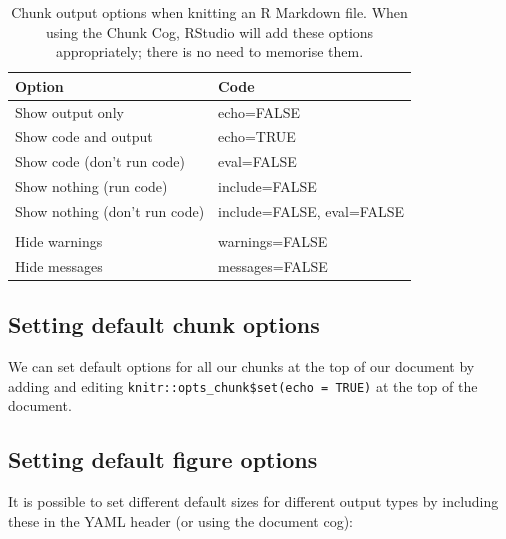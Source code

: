 \documentclass[
  12pt,
  krantz2]{krantz}
\makeatletter
\newenvironment{Shaded}{\begin{snugshade}}{\end{snugshade}}
\newcommand{\BaseNTok}[1]{\textcolor[rgb]{0.00,0.00,0.81}{#1}}
\newenvironment{kframe}{%
\medskip{}
\setlength{\fboxsep}{.8em}
 \def\at@end@of@kframe{}%
 \ifinner\ifhmode%
  \def\at@end@of@kframe{\end{minipage}}%
  \begin{minipage}{\columnwidth}%
 \fi\fi%
 \def\FrameCommand##1{\hskip\@totalleftmargin \hskip-\fboxsep
 \colorbox{shadecolor}{##1}\hskip-\fboxsep
     \hskip-\linewidth \hskip-\@totalleftmargin \hskip\columnwidth}%
 \MakeFramed {\advance\hsize-\width
   \@totalleftmargin\z@ \linewidth\hsize
   \@setminipage}}%
 {\par\unskip\endMakeFramed%
 \at@end@of@kframe}
\renewenvironment{Shaded}{\begin{kframe}}{\end{kframe}}
\makeatother
\begin{document}
\begin{table}

\caption{\label{tab:chap12-tab-chunk-output}Chunk output options when knitting an R Markdown file. When using the Chunk Cog, RStudio will add these options appropriately; there is no need to memorise them.}
\centering
\begin{tabular}[t]{ll}
\toprule
Option & Code\\
\midrule
Show output only & echo=FALSE\\
Show code and output & echo=TRUE\\
Show code (don't run code) & eval=FALSE\\
Show nothing (run code) & include=FALSE\\
Show nothing (don't run code) & include=FALSE, eval=FALSE\\
\addlinespace
 & \\
Hide warnings & warnings=FALSE\\
Hide messages & messages=FALSE\\
\bottomrule
\end{tabular}
\end{table}

\hypertarget{setting-default-chunk-options}{%
\subsection{Setting default chunk options}\label{setting-default-chunk-options}}

We can set default options for all our chunks at the top of our document by adding and editing \texttt{knitr::opts\_chunk\$set(echo\ =\ TRUE)} at the top of the document.

\begin{Shaded}
\end{Shaded}

\hypertarget{setting-default-figure-options}{%
\subsection{Setting default figure options}\label{setting-default-figure-options}}

It is possible to set different default sizes for different output types by including these in the YAML header (or using the document cog):
\end{document}
